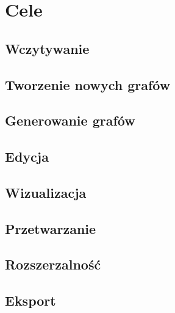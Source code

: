 \chapter{Cele}
\section{Wczytywanie}
\section{Tworzenie nowych grafów}
\section{Generowanie grafów}
\section{Edycja}
\section{Wizualizacja}
\section{Przetwarzanie}
\section{Rozszerzalność}
\section{Eksport}